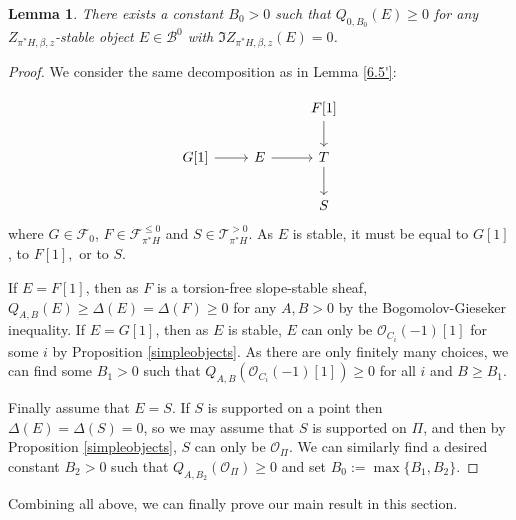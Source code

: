 \documentclass[12pt]{amsart}
\newtheorem{lemma}[theorem]{Lemma}
\theoremstyle{definition}
\begin{document}
\begin{lemma}\label{constRZ}
There exists a constant $B_0>0$ such that $Q_{0,B_0}(E) \geq 0$ for any $Z_{\pi^\ast H,\beta,z}$-stable object $E \in \mathcal{B}^0$ with $\Im Z_{\pi^\ast H,\beta,z}(E)=0$.
\end{lemma}
\begin{proof}
We consider the same decomposition as in Lemma \ref{6.5'}:

\[\begin{tikzcd}
                 &             & {F[1]} \arrow[d] \\
{G[1]} \arrow[r] & E \arrow[r] & T \arrow[d]      \\
                 &             & S               
\end{tikzcd}\]
where $G \in \mathcal{F}_0$, $F \in \mathcal{F}^{\leq 0}_{\pi^\ast H}$ and $S \in \mathcal{T}^{> 0}_{\pi^\ast H}$.
As $E$ is stable, it must be equal to $G[1]$, to $F[1],$ or to $S$.

If $E=F[1]$, then as $F$ is a torsion-free slope-stable sheaf, 
$Q_{A,B}(E) \geq \Delta(E)=\Delta(F) \geq 0$ for any $A,B>0$ by the Bogomolov-Gieseker inequality.
If $E=G[1]$, then as $E$ is stable, $E$ can only be $\mathcal{O}_{C_i}(-1)[1]$ for some $i$ by Proposition \ref{simpleobjects}.
As there are only finitely many choices, we can find some $B_1>0$ such that $Q_{A,B}(\mathcal{O}_{C_i}(-1)[1]) \geq 0$  for all $i$ and $B \geq B_1$.

Finally assume that $E=S$.
If $S$ is supported on a point then $\Delta(E)=\Delta(S) = 0$, so we may assume that $S$ is supported on $\Pi$,
and then by Proposition \ref{simpleobjects}, $S$ can only be $\mathcal{O}_{\Pi}$.
We can similarly find a desired constant $B_2>0$ such that $Q_{A,B_2}(\mathcal{O}_{\Pi}) \geq 0$ and set $B_0:=\max \{B_1,B_2\}$.
\end{proof}

Combining all above, we can finally prove our main result in this section.
\end{document}
